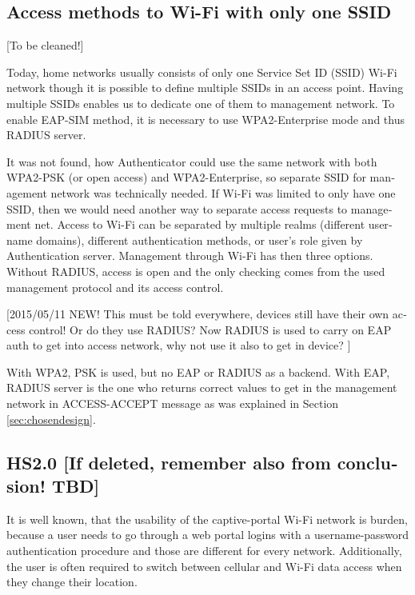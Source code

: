\documentclass[12pt,a4paper,english]{tutthesis}
\begin{document}
\begin{otherlanguage}{english}
\section{Access methods to Wi-Fi with only one SSID}
\label{sec-4-5}

[To be cleaned!]

Today, home networks usually consists of only one Service Set ID (SSID)
Wi-Fi network though it is possible to define multiple SSIDs in
an access point. Having multiple SSIDs enables us to dedicate one of them
to management network. 
To enable EAP-SIM method, it is necessary to use WPA2-Enterprise mode
and thus RADIUS server.

It was not found, how Authenticator could use the same network with
both WPA2-PSK (or open access) and WPA2-Enterprise, so
separate SSID for management network was technically needed.
If Wi-Fi was limited to only have one SSID, then we would need another
way to separate access requests to management net.  Access to Wi-Fi
can be separated by multiple realms (different username domains),
different authentication methods, or user's role
given by Authentication server. Management through Wi-Fi has then three
options.  Without RADIUS, access is open and the only checking comes
from the used management protocol and its access control.

[2015/05/11 NEW! This must be told everywhere, devices still have their own access
control! Or do they use RADIUS? Now RADIUS is used to carry on EAP auth to get into access
network, why not use it also to get in device? ]

With WPA2, PSK is used, but no EAP or RADIUS as a backend.  With EAP,
RADIUS server is the one who returns correct values to get in the
management network in ACCESS-ACCEPT message as was
explained in Section \ref{sec:chosendesign}.


\subsection{HS2.0 [If deleted, remember also from conclusion! TBD]}
\label{sec-4-5-1}

It is well known, that the usability of the captive-portal Wi-Fi
 network is burden, because a user needs to go through 
a web portal logins with a username-password authentication 
procedure and those are different for every network.
Additionally, the user is often required to switch 
between cellular and  Wi-Fi data access when they change their location.


\end{otherlanguage}
\end{document}
